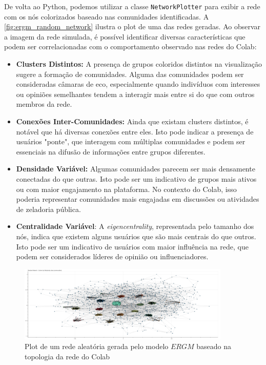 De volta ao Python, podemos utilizar a classe \texttt{NetworkPlotter} para exibir a rede com os nós colorizados baseado nas comunidades identificadas. A \autoref{fig:ergm_random_network} ilustra o plot de uma das redes geradas. Ao observar a imagem da rede simulada, é possível identificar diversas características que podem ser correlacionadas com o comportamento observado nas redes do Colab:

\begin{itemize}
	\item \textbf{Clusters Distintos:} A presença de grupos coloridos distintos na visualização sugere a formação de comunidades. Alguma das comunidades podem ser consideradas câmaras de eco, especialmente quando indivíduos com interesses ou opiniões semelhantes tendem a interagir mais entre si do que com outros membros da rede.
	\item \textbf{Conexões Inter-Comunidades:} Ainda que existam clusters distintos, é notável que há diversas conexões entre eles. Isto pode indicar a presença de usuários "ponte", que interagem com múltiplas comunidades e podem ser essenciais na difusão de informações entre grupos diferentes.
	\item \textbf{Densidade Variável:} Algumas comunidades parecem ser mais densamente conectadas do que outras. Isto pode ser um indicativo de grupos mais ativos ou com maior engajamento na plataforma. No contexto do Colab, isso poderia representar comunidades mais engajadas em discussões ou atividades de zeladoria pública.
	\item \textbf{Centralidade Variável}: A \textit{eigencentrality}, representada pelo tamanho dos nós, indica que existem alguns usuários que são mais centrais do que outros. Isto pode ser um indicativo de usuários com maior influência na rede, que podem ser considerados líderes de opinião ou influenciadores.
\end{itemize}

\begin{figure}[!htb]
	\caption{Plot de um rede aleatória gerada pelo modelo $ERGM$ baseado na topologia da rede do Colab}
	\label{fig:ergm_random_network}
	\centering
	\includegraphics[width=0.9\textwidth]{images/ergm_random_network.png}
	\fautor
\end{figure}

